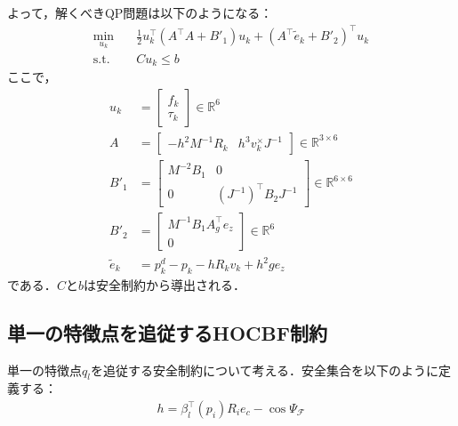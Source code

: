 よって，解くべきQP問題は以下のようになる：
\begin{equation}
\begin{aligned}
\min_{u_k} \quad & \frac{1}{2} u_k^\top (A^\top A + B'_1) u_k + (A^\top \tilde{e}_k + B'_2)^\top u_k \\
\mathrm{s.t.} \quad & C u_k \leq b
\label{eq:holonomic_qp}
\end{aligned}
\end{equation}
ここで，
\begin{equation}
\begin{aligned}
u_k &= \begin{bmatrix} f_k \\ \tau_k \end{bmatrix} \in \mathbb{R}^6 \\
A &= \begin{bmatrix} -h^2 M^{-1} R_k & h^3 v_k^\times J^{-1} \end{bmatrix} \in \mathbb{R}^{3 \times 6} \\
B'_1 &= \begin{bmatrix} M^{-2} B_1 & 0 \\ 0 & (J^{-1})^\top B_2 J^{-1} \end{bmatrix} \in \mathbb{R}^{6 \times 6} \\
B'_2 &= \begin{bmatrix} M^{-1} B_1 A_g^\top e_z \\ 0 \end{bmatrix} \in \mathbb{R}^6 \\
\tilde{e}_k &= p^d_k - p_k - h R_k v_k + h^2 g e_z
\label{eq:holonomic_qp_params}
\end{aligned}
\end{equation}
である．$C$と$b$は安全制約から導出される．

\subsection{単一の特徴点を追従するHOCBF制約}

単一の特徴点$q_l$を追従する安全制約について考える．安全集合を以下のように定義する：
\begin{equation}
\begin{aligned}
h = \beta_l^\top(p_i) R_i e_c - \cos\Psi_\mathcal{F}
\label{eq:single_hocbf_safe_set}
\end{aligned}
\end{equation}

